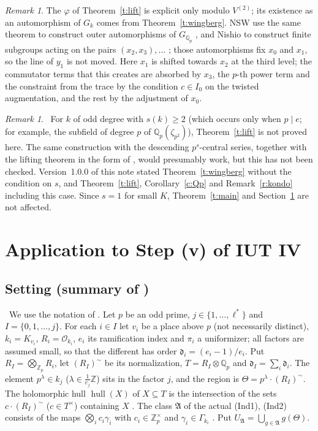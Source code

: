 \documentclass[11pt,a4paper]{article}
\newcommand{\Z}{\mathbb{Z}}
\newcommand{\Zp}{\mathbb{Z}_p}
\newcommand{\Qp}{\mathbb{Q}_p}
\newcommand{\cO}{\mathcal{O}}
\newcommand{\fd}{\mathfrak{d}}
\newcommand{\cA}{\mathfrak{A}}
\newcommand{\tI}{(R_I)^{\sim}}
\newcommand{\hull}{\operatorname{hull}}
\newcommand{\lab}[2]{{\upshape\fcolorbox{#1}{#1!8}{\scriptsize\sffamily\bfseries\textcolor{#1}{#2}}}}
\newcommand{\tagS}{\lab{blue}{S}}
\newcommand{\tagH}{\lab{BurntOrange}{H}}
\theoremstyle{plain}
\theoremstyle{definition}
\theoremstyle{remark}
\newtheorem{remark}[theorem]{Remark}
\begin{document}
\begin{remark}\label{r:explicit}
The $\varphi$ of Theorem~\ref{t:lift} is explicit only modulo $V^{(2)}$; its existence as an automorphism of $G_k$ comes
from Theorem~\ref{t:wingberg}. NSW use the same theorem to construct outer automorphisms of $G_{\Qp}$
\cite[pp.~421--423]{NSW}, and Nishio to construct finite subgroups acting on the pairs $(x_2,x_3),\dots$
\cite[Prop.~2.6]{Nishio26}; those automorphisms fix $x_0$ and $x_1$, so the line of $y_1$ is not moved. Here $x_1$ is
shifted towards $x_2$ at the third level; the commutator terms that this creates are absorbed by $x_3$, the $p$-th
power term and the constraint from the trace by the condition $c\in I_0$ on the twisted augmentation, and the rest by
the adjustment of $x_0$.
\end{remark}

\begin{remark}\label{r:sge2}
\tagH\ For $k$ of odd degree with $s(k)\ge2$ (which occurs only when $p\mid e$; for example, the subfield of degree
$p$ of $\Qp(\zeta_{p^2})$), Theorem~\ref{t:lift} is not proved here. The same construction with the descending
$p^s$-central series, together with the lifting theorem in the form of \cite[Prop.~2.6]{Nishio26}, would presumably
work, but this has not been checked. Version~1.0.0 of this note stated Theorem~\ref{t:wingberg} without the condition
on $s$, and Theorem~\ref{t:lift}, Corollary~\ref{c:Qp} and Remark~\ref{r:kondo} including this case. Since $s=1$ for
small $K$, Theorem~\ref{t:main} and Section~\ref{s:iut} are not affected.
\end{remark}

\section{Application to Step (v) of IUT IV}\label{s:iut}

\subsection{Setting (summary of \cite{Tiers})}
\tagS\ We use the notation of \cite[\S2]{Tiers}. Let $p$ be an odd prime, $j\in\{1,\dots,\ell^{*}\}$ and
$I=\{0,1,\dots,j\}$. For each $i\in I$ let $v_i$ be a place above $p$ (not necessarily distinct),
$k_i=K_{v_i}$, $R_i=\cO_{k_i}$, $e_i$ its ramification index and $\pi_i$ a uniformizer; all factors are assumed
small, so that the different has order $\fd_i=(e_i-1)/e_i$. Put $R_I=\bigotimes_{\Zp}R_i$, let $\tI$ be its
normalization, $T=R_I\otimes\Qp$ and $\fd_I=\sum_i\fd_i$. The element $p^{\lambda}\in k_j$
($\lambda\in\frac1{e_j}\Z$) sits in the factor $j$, and the region is $\Theta=p^{\lambda}\cdot\tI$. The holomorphic
hull $\hull(X)$ of $X\subseteq T$ is the intersection of the sets $c\cdot\tI$ ($c\in T^{\times}$) containing $X$
\cite[Rem.~3.9.5(i)]{IUT3}. The class $\cA$ of the actual (Ind1), (Ind2) consists of the maps $\bigotimes_ic_i\gamma_i$
with $c_i\in\Zp^{\times}$ and $\gamma_i\in\Gamma_{k_i}$ \cite[Def.~2.3]{Tiers}. Put
$U_{\cA}=\bigcup_{g\in\cA}g(\Theta)$.
\end{document}
